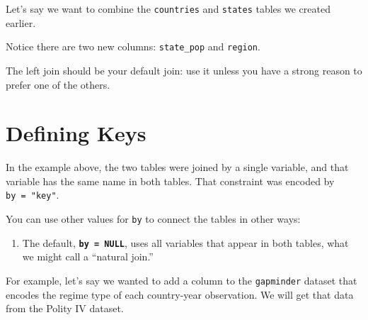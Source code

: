 \documentclass[]{book}
\newenvironment{Shaded}{\begin{snugshade}}{\end{snugshade}}
\newcommand{\KeywordTok}[1]{\textcolor[rgb]{0.13,0.29,0.53}{\textbf{#1}}}
\newcommand{\DataTypeTok}[1]{\textcolor[rgb]{0.13,0.29,0.53}{#1}}
\newcommand{\StringTok}[1]{\textcolor[rgb]{0.31,0.60,0.02}{#1}}
\newcommand{\CommentTok}[1]{\textcolor[rgb]{0.56,0.35,0.01}{\textit{#1}}}
\newcommand{\OperatorTok}[1]{\textcolor[rgb]{0.81,0.36,0.00}{\textbf{#1}}}
\newcommand{\NormalTok}[1]{#1}
\providecommand{\tightlist}{%
  \setlength{\itemsep}{0pt}\setlength{\parskip}{0pt}}
\begin{document}
Let's say we want to combine the \texttt{countries} and \texttt{states}
tables we created earlier.

\begin{Shaded}
\end{Shaded}

Notice there are two new columns: \texttt{state\_pop} and
\texttt{region}.

The left join should be your default join: use it unless you have a
strong reason to prefer one of the others.

\section{Defining Keys}\label{defining-keys}

In the example above, the two tables were joined by a single variable,
and that variable has the same name in both tables. That constraint was
encoded by \texttt{by\ =\ "key"}.

You can use other values for \texttt{by} to connect the tables in other
ways:

\begin{enumerate}
\def\labelenumi{\arabic{enumi}.}
\tightlist
\item
  The default, \textbf{\texttt{by\ =\ NULL}}, uses all variables that
  appear in both tables, what we might call a ``natural join.''
\end{enumerate}

For example, let's say we wanted to add a column to the
\texttt{gapminder} dataset that encodes the regime type of each
country-year observation. We will get that data from the Polity IV
dataset.
\end{document}
